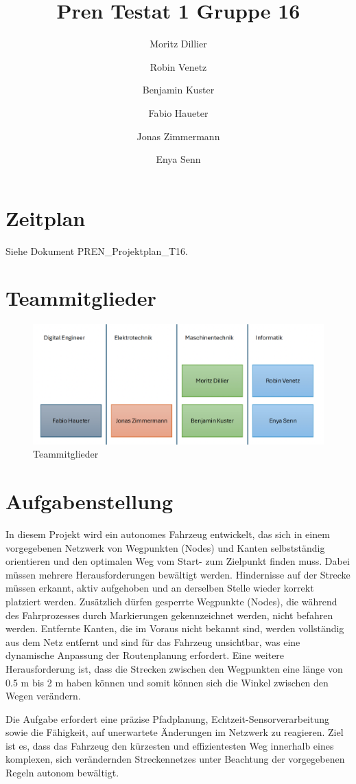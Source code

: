 \documentclass{article}
\title{Pren Testat 1 Gruppe 16}
\author{Moritz Dillier \and Robin Venetz \and Benjamin Kuster \and Fabio Haueter \and Jonas Zimmermann \and Enya Senn}
\date{\thedate}
\begin{document}
\maketitle

\tableofcontents 


\section{Zeitplan}
Siehe Dokument PREN\_Projektplan\_T16.


\section{Teammitglieder}
\begin{figure}[H]
	\centering
	\includegraphics[width=0.8\linewidth]{Images/Pren_Gruppe.png}
	\caption{Teammitglieder}
	\label{fig:enter-label}
\end{figure}


\section{Aufgabenstellung}
In diesem Projekt wird ein autonomes Fahrzeug entwickelt, das sich in einem vorgegebenen Netzwerk von Wegpunkten (Nodes) und Kanten selbstständig orientieren und den optimalen Weg vom Start- zum Zielpunkt finden muss. Dabei müssen mehrere Herausforderungen bewältigt werden. Hindernisse auf der Strecke müssen erkannt, aktiv aufgehoben und an derselben Stelle wieder korrekt platziert werden. Zusätzlich dürfen gesperrte Wegpunkte (Nodes), die während des Fahrprozesses durch Markierungen gekennzeichnet werden, nicht befahren werden. Entfernte Kanten, die im Voraus nicht bekannt sind, werden vollständig aus dem Netz entfernt und sind für das Fahrzeug unsichtbar, was eine dynamische Anpassung der Routenplanung erfordert. Eine weitere Herausforderung ist, dass die Strecken zwischen den Wegpunkten eine länge von 0.5 m bis 2 m haben können und somit können sich die Winkel zwischen den Wegen verändern.

\hfill \break
Die Aufgabe erfordert eine präzise Pfadplanung, Echtzeit-Sensorverarbeitung sowie die Fähigkeit, auf unerwartete Änderungen im Netzwerk zu reagieren. Ziel ist es, dass das Fahrzeug den kürzesten und effizientesten Weg innerhalb eines komplexen, sich verändernden Streckennetzes unter Beachtung der vorgegebenen Regeln autonom bewältigt.
\end{document}
